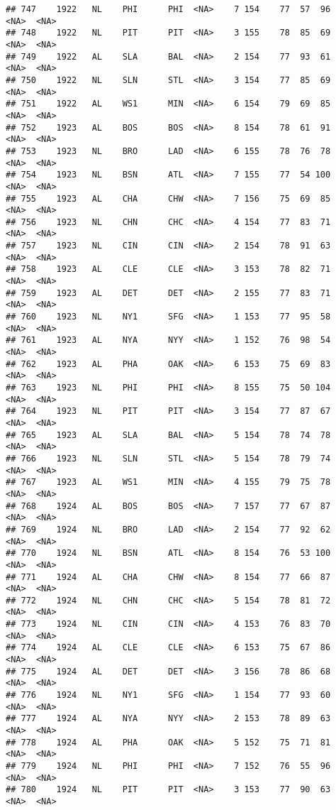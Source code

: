 \documentclass[]{article}
\begin{document}
\begin{verbatim}
## 747    1922   NL    PHI      PHI  <NA>    7 154    77  57  96   <NA>  <NA>
## 748    1922   NL    PIT      PIT  <NA>    3 155    78  85  69   <NA>  <NA>
## 749    1922   AL    SLA      BAL  <NA>    2 154    77  93  61   <NA>  <NA>
## 750    1922   NL    SLN      STL  <NA>    3 154    77  85  69   <NA>  <NA>
## 751    1922   AL    WS1      MIN  <NA>    6 154    79  69  85   <NA>  <NA>
## 752    1923   AL    BOS      BOS  <NA>    8 154    78  61  91   <NA>  <NA>
## 753    1923   NL    BRO      LAD  <NA>    6 155    78  76  78   <NA>  <NA>
## 754    1923   NL    BSN      ATL  <NA>    7 155    77  54 100   <NA>  <NA>
## 755    1923   AL    CHA      CHW  <NA>    7 156    75  69  85   <NA>  <NA>
## 756    1923   NL    CHN      CHC  <NA>    4 154    77  83  71   <NA>  <NA>
## 757    1923   NL    CIN      CIN  <NA>    2 154    78  91  63   <NA>  <NA>
## 758    1923   AL    CLE      CLE  <NA>    3 153    78  82  71   <NA>  <NA>
## 759    1923   AL    DET      DET  <NA>    2 155    77  83  71   <NA>  <NA>
## 760    1923   NL    NY1      SFG  <NA>    1 153    77  95  58   <NA>  <NA>
## 761    1923   AL    NYA      NYY  <NA>    1 152    76  98  54   <NA>  <NA>
## 762    1923   AL    PHA      OAK  <NA>    6 153    75  69  83   <NA>  <NA>
## 763    1923   NL    PHI      PHI  <NA>    8 155    75  50 104   <NA>  <NA>
## 764    1923   NL    PIT      PIT  <NA>    3 154    77  87  67   <NA>  <NA>
## 765    1923   AL    SLA      BAL  <NA>    5 154    78  74  78   <NA>  <NA>
## 766    1923   NL    SLN      STL  <NA>    5 154    78  79  74   <NA>  <NA>
## 767    1923   AL    WS1      MIN  <NA>    4 155    79  75  78   <NA>  <NA>
## 768    1924   AL    BOS      BOS  <NA>    7 157    77  67  87   <NA>  <NA>
## 769    1924   NL    BRO      LAD  <NA>    2 154    77  92  62   <NA>  <NA>
## 770    1924   NL    BSN      ATL  <NA>    8 154    76  53 100   <NA>  <NA>
## 771    1924   AL    CHA      CHW  <NA>    8 154    77  66  87   <NA>  <NA>
## 772    1924   NL    CHN      CHC  <NA>    5 154    78  81  72   <NA>  <NA>
## 773    1924   NL    CIN      CIN  <NA>    4 153    76  83  70   <NA>  <NA>
## 774    1924   AL    CLE      CLE  <NA>    6 153    75  67  86   <NA>  <NA>
## 775    1924   AL    DET      DET  <NA>    3 156    78  86  68   <NA>  <NA>
## 776    1924   NL    NY1      SFG  <NA>    1 154    77  93  60   <NA>  <NA>
## 777    1924   AL    NYA      NYY  <NA>    2 153    78  89  63   <NA>  <NA>
## 778    1924   AL    PHA      OAK  <NA>    5 152    75  71  81   <NA>  <NA>
## 779    1924   NL    PHI      PHI  <NA>    7 152    76  55  96   <NA>  <NA>
## 780    1924   NL    PIT      PIT  <NA>    3 153    77  90  63   <NA>  <NA>

\end{verbatim}
\end{document}
